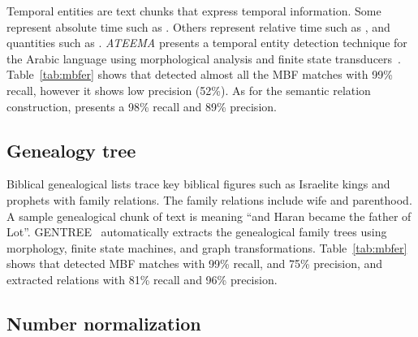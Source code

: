 Temporal entities are text chunks that express temporal information. 
Some represent absolute time such as . 
Others represent relative time such as , and quantities 
such as . 
{\em ATEEMA} presents a temporal entity detection technique for the Arabic language using 
morphological analysis and finite state transducers~\cite{ZaMa2012IJCLATime}. 
%
Table~\ref{tab:mbfer} shows that \framework detected almost all the MBF matches with 99\% recall, 
however it shows low precision (52\%). 
As for the semantic relation construction, \framework presents a 98\% recall and 89\% precision.

\vspace{-1.5em}
\subsection{Genealogy tree}
\vspace{-1em}

Biblical genealogical lists trace key biblical figures such as Israelite kings and
prophets with family relations. 
The family relations include wife and parenthood. 
A sample genealogical chunk of text is  
meaning ``and Haran became the father of Lot''.
%
GENTREE~\cite{ZaMaHaCicling2012Entity} 
automatically extracts the genealogical family trees using morphology, 
finite state machines, and graph transformations. 
Table~\ref{tab:mbfer} shows that \framework detected 
MBF matches with 99\% recall, and 75\% precision, and
extracted relations with 81\% recall and 96\% precision.

\vspace{-1em}
\subsection{Number normalization}
\label{subsec:numnorm}

